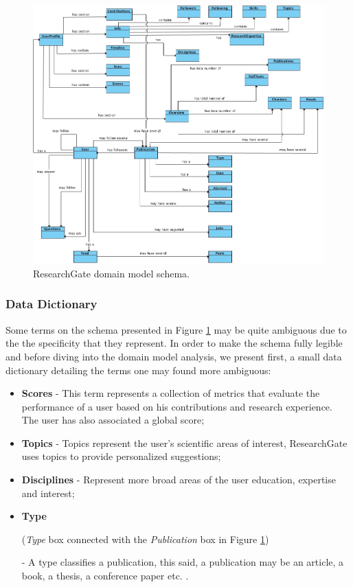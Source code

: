 \begin{figure}[h!]
  \hspace*{-1in}
  \includegraphics[width=1.28\textwidth]{img/researchgate-domain-model.jpg}
\caption{\label{img:rgatedomain} ResearchGate domain model schema.}
\end{figure}

\subsubsection*{Data Dictionary}
Some terms on the schema presented in Figure \ref{img:rgatedomain} may be quite ambiguous due to the the specificity that they represent. In order to make the schema fully legible and before diving into the domain model analysis, we present first, a small data dictionary detailing the terms one may found more ambiguous:

\begin{itemize}
\item \textbf{Scores} - This term represents a collection of metrics that evaluate the performance of a user based on his contributions and research experience. The user has also associated a global score;
\item \textbf{Topics} - Topics represent the user's scientific areas of interest, ResearchGate uses topics to provide personalized suggestions;
\item \textbf{Disciplines} - Represent more broad areas of the user education, expertise and interest;
\item \textbf{Type} \begin{small}(\textit{Type} box connected with the \textit{Publication} box in Figure \ref{img:rgatedomain})\end{small} - A type classifies a publication, this said, a publication may be an article, a book, a thesis, a conference paper etc. .
\end{itemize}

